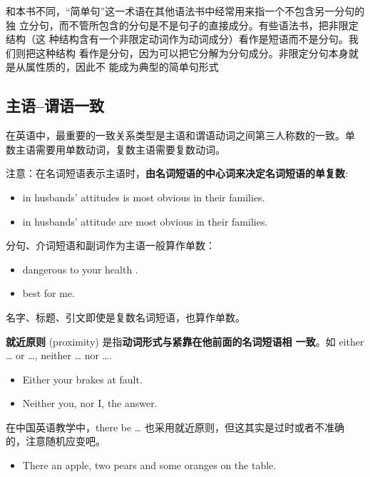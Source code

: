和本书不同，“简单句”这一术语在其他语法书中经常用来指一个不包含另一分句的独
立分句，而不管所包含的分句是不是句子的直接成分。有些语法书，把非限定结构（这
种结构含有一个非限定动词作为动词成分）看作是短语而不是分句。我们则把这种结构
看作是分句，因为可以把它分解为分句成分。非限定分句本身就是从属性质的，因此不
能成为典型的简单句形式

\subsection{主语--谓语一致}

在英语中，最重要的一致关系类型是主语和谓语动词之间第三人称数的一致。单
数主语需要用单数动词，复数主语需要复数动词。

注意：在名词短语表示主语时，\textbf{由名词短语的中心词来决定名词短语的单复数}:
\begin{itemize}
\item {} in husbands' attitudes is most obvious in their families.
\item {} in husbands' attitude are most obvious in their families.
\end{itemize}

分句、介词短语和副词作为主语一般算作单数：
\begin{itemize}
\item {}  dangerous to your health .

\item {}  best for me.
\end{itemize}

名字、标题、引文即使是复数名词短语，也算作单数。

\textbf{就近原则} (proximity) 是指\textbf{动词形式与紧靠在他前面的名词短语相
  一致}。如 either \ldots{} or \ldots{}, neither \ldots{} nor \ldots{}.
\begin{itemize}
\item Either your brakes   at fault.
\item Neither you, nor I,   the answer.
\end{itemize}

在中国英语教学中，there be \ldots{} 也采用就近原则，但这其实是过时或者不准确
的，注意随机应变吧。
\begin{itemize}
\item There  an apple, two pears and some oranges on the table.
\end{itemize}

